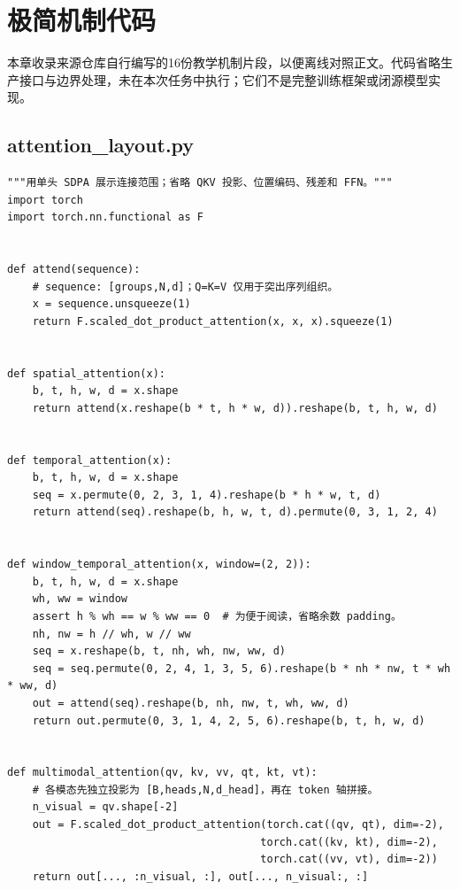 \chapter{极简机制代码}

\label{seedance-code}

本章收录来源仓库自行编写的16份教学机制片段，以便离线对照正文。代码省略生产接口与边界处理，未在本次任务中执行；它们不是完整训练框架或闭源模型实现。

\section{attention\_layout.py}
\label{code-attention-layout}
\begin{verbatim}
"""用单头 SDPA 展示连接范围；省略 QKV 投影、位置编码、残差和 FFN。"""
import torch
import torch.nn.functional as F


def attend(sequence):
    # sequence: [groups,N,d]；Q=K=V 仅用于突出序列组织。
    x = sequence.unsqueeze(1)
    return F.scaled_dot_product_attention(x, x, x).squeeze(1)


def spatial_attention(x):
    b, t, h, w, d = x.shape
    return attend(x.reshape(b * t, h * w, d)).reshape(b, t, h, w, d)


def temporal_attention(x):
    b, t, h, w, d = x.shape
    seq = x.permute(0, 2, 3, 1, 4).reshape(b * h * w, t, d)
    return attend(seq).reshape(b, h, w, t, d).permute(0, 3, 1, 2, 4)


def window_temporal_attention(x, window=(2, 2)):
    b, t, h, w, d = x.shape
    wh, ww = window
    assert h % wh == w % ww == 0  # 为便于阅读，省略余数 padding。
    nh, nw = h // wh, w // ww
    seq = x.reshape(b, t, nh, wh, nw, ww, d)
    seq = seq.permute(0, 2, 4, 1, 3, 5, 6).reshape(b * nh * nw, t * wh * ww, d)
    out = attend(seq).reshape(b, nh, nw, t, wh, ww, d)
    return out.permute(0, 3, 1, 4, 2, 5, 6).reshape(b, t, h, w, d)


def multimodal_attention(qv, kv, vv, qt, kt, vt):
    # 各模态先独立投影为 [B,heads,N,d_head]，再在 token 轴拼接。
    n_visual = qv.shape[-2]
    out = F.scaled_dot_product_attention(torch.cat((qv, qt), dim=-2),
                                        torch.cat((kv, kt), dim=-2),
                                        torch.cat((vv, vt), dim=-2))
    return out[..., :n_visual, :], out[..., n_visual:, :]
\end{verbatim}


